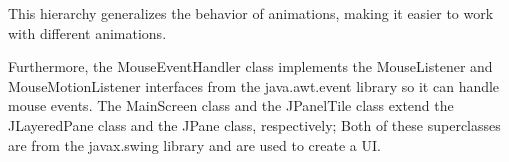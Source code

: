\documentclass{article}
\begin{document}
This hierarchy generalizes the behavior of animations, making it easier to work with different animations.

Furthermore, the MouseEventHandler class implements the MouseListener and MouseMotionListener interfaces from the java.awt.event library so it can handle mouse events.
The MainScreen class and the JPanelTile class extend the JLayeredPane class and the JPane class, respectively; Both of these superclasses are from the javax.swing library and are used to create a UI.
\end{document}
